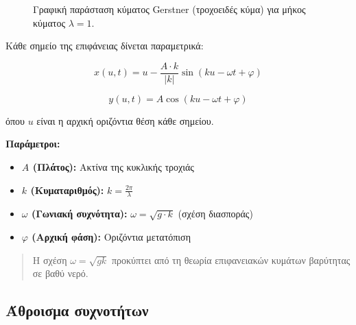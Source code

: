 \documentclass[a4paper, 11pt]{article}
\providecommand{\tightlist}{\setlength{\itemsep}{0pt}\setlength{\parskip}{0pt}}
\begin{document}
\begin{figure}[htbp]
\centering
{}
\caption{Γραφική παράσταση κύματος Gerstner (τροχοειδές κύμα) για μήκος κύματος $\lambda = 1$.}
\label{fig:gerstner}
\end{figure}

Κάθε σημείο της επιφάνειας δίνεται παραμετρικά:

\[x(u, t) = u - \frac{A \cdot k}{|k|} \sin(k u - \omega t + \varphi)\]

\[y(u, t) = A \cos(k u - \omega t + \varphi)\]

όπου \(u\) είναι η αρχική οριζόντια θέση κάθε σημείου.

\textbf{Παράμετροι:}

\begin{itemize}
\tightlist
\item
  \textbf{\(A\) (Πλάτος):} Ακτίνα της κυκλικής τροχιάς
\item
  \textbf{\(k\) (Κυματαριθμός):} \(k = \frac{2\pi}{\lambda}\)
\item
  \textbf{\(\omega\) (Γωνιακή συχνότητα):} \(\omega = \sqrt{g \cdot k}\)
  (σχέση διασποράς)
\item
  \textbf{\(\varphi\) (Αρχική φάση):} Οριζόντια μετατόπιση
\end{itemize}

\begin{quote}
Η σχέση \(\omega = \sqrt{gk}\) προκύπτει από τη θεωρία επιφανειακών
κυμάτων βαρύτητας σε βαθύ νερό.
\end{quote}

\subsection{Άθροισμα
συχνοτήτων}\label{ux3acux3b8ux3c1ux3bfux3b9ux3c3ux3bcux3b1-ux3c3ux3c5ux3c7ux3bdux3bfux3c4ux3aeux3c4ux3c9ux3bd}
\end{document}
